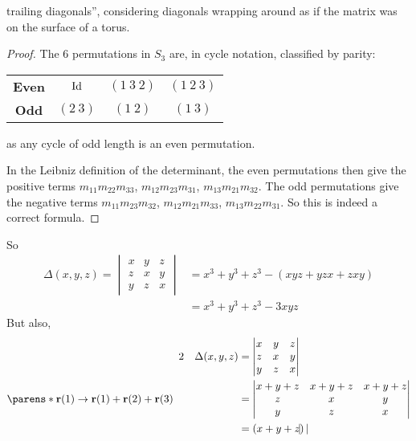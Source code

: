 \documentclass[fleqn,a4paper,11pt]{article}
\begin{document}
\begin{enumerate}[label=\textbf{\arabic*.}]
\begin{lemma}
    trailing diagonals'', considering diagonals wrapping around as if the matrix
    was on the surface of a torus.
   \end{lemma}
   \begin{proof}
    The \(6\) permutations in \(S_3\) are, in cycle notation, classified by
    parity:
    \begin{center}
     \begin{tabular}{*4c}
      \bfseries Even & \(\operatorname{Id}\) & \((1\ 3\ 2)\) & \((1\ 2\ 3)\) \\
      \bfseries Odd & \((2\ 3)\) & \((1\ 2)\) & \((1\ 3)\)
     \end{tabular}
    \end{center}
    as any cycle of odd length is an even permutation.

    In the Leibniz definition of the determinant, the even permutations
    then give the positive terms
    \({m_{11} m_{22} m_{33}}\),
    \({m_{12} m_{23} m_{31}}\),
    \({m_{13} m_{21} m_{32}}\).
    The odd permutations give the negative terms
    \(m_{11} m_{23} m_{32}\),
    \(m_{12} m_{21} m_{33}\),
    \(m_{13} m_{22} m_{31}\). So this is indeed a correct formula.
   \end{proof}
   So
   \begin{align*}
    \Delta(x, y, z) =
    \begin{vmatrix}
     x & y & z \\
     z & x & y \\
     y & z & x
    \end{vmatrix}
     &= x^3 + y^3 + z^3 - (xyz + yzx + zxy) \\
     &= x^3 + y^3 + z^3 - 3xyz
   \end{align*}
   But also,
   \begin{alignat*}2
    && \Delta(x, y, z) &= \begin{vmatrix}
     x & y & z \\
     z & x & y \\
     y & z & x
    \end{vmatrix} \\
    \parens*{
     \vec r(1) \to \vec r(1) + \vec r(2) + \vec r(3)
    } \quad
    && &= \begin{vmatrix}
     x + y + z & x + y + z & x + y + z \\
     z & x & y \\
     y & z & x
    \end{vmatrix} \\
    && &= (x + y + z)\begin{vmatrix}

\end{vmatrix}
\end{alignat*}
\end{enumerate}
\end{document}
